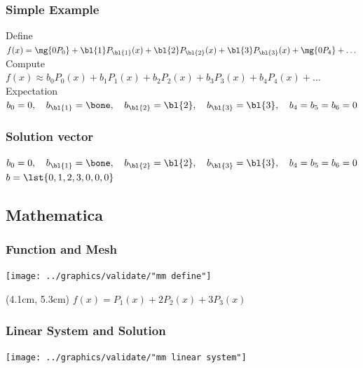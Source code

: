 \documentclass[handout]{beamer}
\begin{document}
\begin{frame}
  \frametitle{Simple Example}  %
  \centering
  Define \\[5pt]
  $f(x) = \mg{0 P_{0}} + \bl{1}P_{\bl{1}}(x) + \bl{2}P_{\bl{2}}(x) + \bl{3}P_{\bl{3}}(x) + \mg{0 P_{4}} + \dots$ \\[20pt]
  Compute \\[5pt]
  $f(x) \approx b_{0} P_{0}(x) +  b_{1} P_{1}(x) + b_{2} P_{2}(x) + b_{3} P_{3}(x) + b_{4} P_{4}(x) + \dots$ \\[20pt]
  Expectation \\[5pt]
  $b_{0} = 0, \quad b_{\bl{1}} = \bone, \quad b_{\bl{2}} = \bl{2}, \quad b_{\bl{3}} = \bl{3}, \quad b_{4} = b_{5} = b_{6} = 0$
\end{frame}

\begin{frame}
  \frametitle{Solution vector}  %
  \centering
  $b_{0} = 0, \quad b_{\bl{1}} = \bone, \quad b_{\bl{2}} = \bl{2}, \quad b_{\bl{3}} = \bl{3}, \quad b_{4} = b_{5} = b_{6} = 0$\\[20pt]
  $b = \lst{0,1,2,3,0,0,0}$
  \onedot
\end{frame}

\subsection{Mathematica}

\begin{frame}
  \frametitle{Function and Mesh}  %
  \centering
  \texttt{[image: ../graphics/validate/"mm define"]}
  \begin{textblock*}{7cm}(4.1cm, 5.3cm)%
     $f(x) = P_{1}(x) + 2P_{2}(x) + 3P_{3}(x)$
  \end{textblock*}
\end{frame}

\begin{frame}
  \frametitle{Linear System and Solution}  %
  \centering
  \texttt{[image: ../graphics/validate/"mm linear system"]}
\end{frame}
\end{document}
